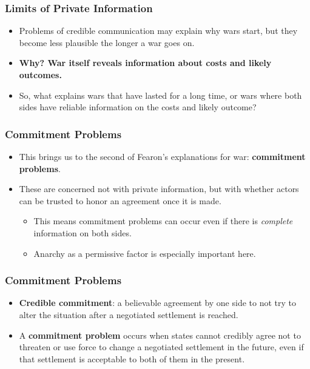 \documentclass{beamer}
\begin{document}
\begin{frame} 
	\frametitle{\LARGE{Limits of Private Information}}
	\begin{itemize}
		\item Problems of credible communication may explain why wars start, but they become less plausible the longer a war goes on. \pause
		\item \textbf{Why? War itself reveals information about costs and likely outcomes.} \pause
		\item So, what explains wars that have lasted for a long time, or wars where both sides have reliable information on the costs and likely outcome?
	\end{itemize}
\end{frame}

\begin{frame} 
	\frametitle{\LARGE{Commitment Problems}}
	\begin{itemize}
		\item This brings us to the second of Fearon's explanations for war: \textbf{commitment problems}. \pause
		\item These are concerned not with private information, but with whether actors can be trusted to honor an agreement once it is made. \pause
		\begin{itemize}
			\item This means commitment problems can occur even if there is \textit{complete} information on both sides. \pause
			\item Anarchy as a permissive factor is especially important here.
		\end{itemize}
	\end{itemize}
\end{frame}

\begin{frame} 
	\frametitle{\LARGE{Commitment Problems}}
	\begin{itemize}
		\item \textbf{Credible commitment}: a believable agreement by one side to not try to alter the situation after a negotiated settlement is reached. \pause 
		\item A \textbf{commitment problem} occurs when states cannot credibly agree not to threaten or use force to change a negotiated settlement in the future, even if that settlement is acceptable to both of them in the present.
	\end{itemize}
\end{frame}
\end{document}
